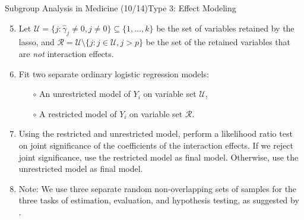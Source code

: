\documentclass[11pt]{beamer}
\begin{document}
\begin{frame}{Subgroup Analysis in Medicine (10/14)}{Type 3: Effect Modeling}
\begin{enumerate}
\setcounter{enumi}{4}
\item Let $\mathcal{U} = \{j: \hat{\gamma}_j \neq 0, j \neq 0\} \subseteq \{1,\dots,k\}$ be the set of variables retained by the lasso, and $\mathcal{R} = \mathcal{U} \setminus \{j: j \in \mathcal{U}, j > p \}$ be the set of the retained variables that are \textit{not} interaction effects.
\item Fit two separate ordinary logistic regression models: 
\begin{itemize}
	\item[$\circ$] An \alert{unrestricted} model of $Y_i$ on variable set $\mathcal{U}$,
	\item[$\circ$] A \alert{restricted} model of $Y_i$ on variable set $\mathcal{R}$.
\end{itemize}
\item Using the restricted and unrestricted model, perform a likelihood ratio test on joint significance of the coefficients of the interaction effects. If we reject joint significance, use the restricted model as final model. Otherwise, use the unrestricted model as final model.
\item Note: We use three separate random non-overlapping sets of samples for the three tasks of estimation, evaluation, and hypothesis testing, as suggested by \cite{wasserman2009}.
\end{enumerate}
\end{frame}
\end{document}
